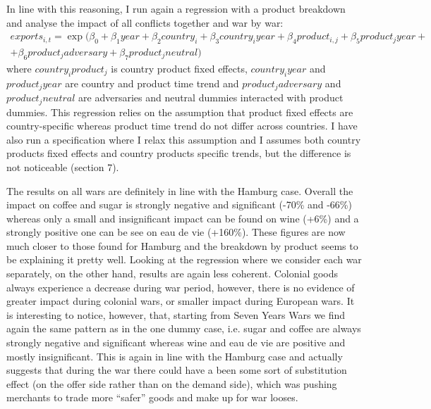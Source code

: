\documentclass[12pt,a4paper,titlepage,english]{article}
\begin{document}
In line with this reasoning, I run again a regression with a product breakdown and analyse the impact of all conflicts together and war by war:
\begin{multline}
exports_{i,t}=\exp(\beta_0+\beta_1year +\beta_2country_i+\beta_3country_iyear+\beta_4product_{i,j}+\beta_5product_jyear+\\+\beta_6product_jadversary + \beta_7product_jneutral)
\end{multline}
where $country_iproduct_j$ is country product fixed effects, $country_iyear$ and $product_jyear$ are country and product time trend and $product_jadversary$ and $product_jneutral$ are adversaries and neutral dummies interacted with product dummies. This regression relies on the assumption that product fixed effects are country-specific whereas product time trend do not differ across countries. I have also run a specification where I relax this assumption and I assumes both country products fixed effects and country products specific trends, but the difference is not noticeable (section 7). 




The results on all wars are definitely in line with the Hamburg case. Overall the impact on coffee and sugar is strongly negative and significant (-70\% and -66\%) whereas only a small and insignificant impact can be found on wine (+6\%) and a strongly positive one can be see on eau de vie (+160\%). These figures are now much closer to those found for Hamburg and the breakdown by product seems to be explaining it pretty well. Looking at the regression where we consider each war separately, on the other hand, results are again less coherent. Colonial goods always experience a decrease during war period, however, there is no evidence of greater impact during colonial wars, or smaller impact during European wars. It is interesting to notice, however, that, starting from Seven Years Wars we find again the same pattern as in the one dummy case, i.e. sugar and coffee are always strongly negative and significant whereas wine and eau de vie are positive and mostly insignificant. This is again in line with the Hamburg case and actually suggests that during the war there could have a been some sort of substitution effect (on the offer side rather than on the demand side), which was pushing merchants to trade more “safer” goods and make up for war looses.\\
\iffalse
\end{document}
